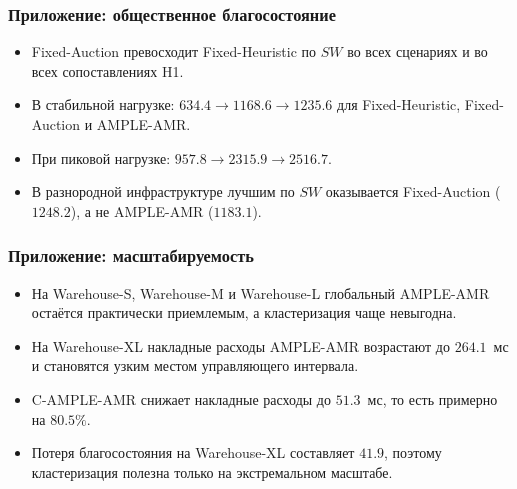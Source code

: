 \begin{frame}
	\frametitle{Приложение: общественное благосостояние}
	\small
	\begin{center}
	\end{center}
	\begin{itemize}
		\item Fixed-Auction превосходит Fixed-Heuristic по $SW$ во всех сценариях и во всех сопоставлениях H1.
		\item В стабильной нагрузке: $634.4 \rightarrow 1168.6 \rightarrow 1235.6$ для Fixed-Heuristic, Fixed-Auction и AMPLE-AMR.
		\item При пиковой нагрузке: $957.8 \rightarrow 2315.9 \rightarrow 2516.7$.
		\item В разнородной инфраструктуре лучшим по $SW$ оказывается Fixed-Auction ($1248.2$), а не AMPLE-AMR ($1183.1$).
	\end{itemize}
\end{frame}

\begin{frame}
	\frametitle{Приложение: масштабируемость}
	\small
	\begin{center}
	\end{center}
	\begin{itemize}
		\item На Warehouse-S, Warehouse-M и Warehouse-L глобальный AMPLE-AMR остаётся практически приемлемым, а кластеризация чаще невыгодна.
		\item На Warehouse-XL накладные расходы AMPLE-AMR возрастают до $264.1$~мс и становятся узким местом управляющего интервала.
		\item C-AMPLE-AMR снижает накладные расходы до $51.3$~мс, то есть примерно на $80.5\%$.
		\item Потеря благосостояния на Warehouse-XL составляет $41.9$, поэтому кластеризация полезна только на экстремальном масштабе.
	\end{itemize}
\end{frame}

